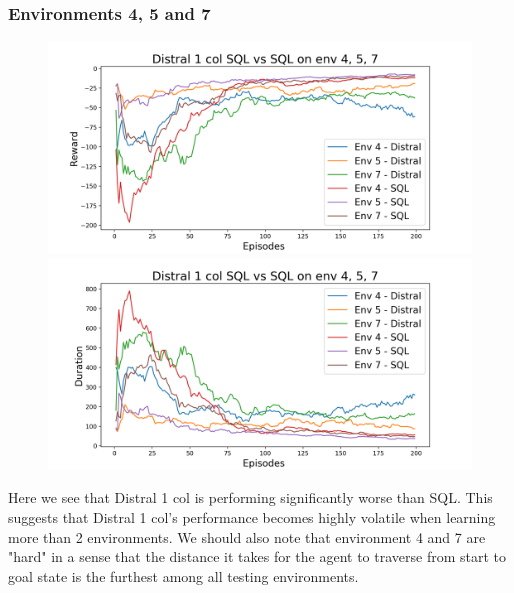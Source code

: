 \documentclass[12pt]{report}
\begin{document}
\subsubsection{Environments 4, 5 and 7}
\begin{figure}[H]
\centering
\begin{minipage}{.5\textwidth}
\centering
\includegraphics[width=\textwidth]{figs/d1_col_sql/d1_col_sql_4_5_7_rwd.png}
\end{minipage}%
\centering
\begin{minipage}{.5\textwidth}
\centering
\includegraphics[width=\textwidth]{figs/d1_col_sql/d1_col_sql_4_5_7_dur.png}
\end{minipage}%
\end{figure}
Here we see that Distral 1 col is performing significantly worse than SQL. This suggests that Distral 1 col's performance becomes highly volatile when learning more than 2 environments. We should also note that environment 4 and 7 are "hard" in a sense that the distance it takes for the agent to traverse from start to goal state is the furthest among all testing environments.
\end{document}
